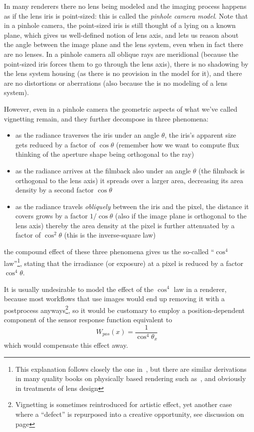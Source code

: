 In many renderers there no lens being modeled and the imaging process happens as if the
lens \gls{iris} is point-sized: this is called the \textsl{\gls{pinhole camera} model}.
Note that in a pinhole camera, the point-sized iris is still thought of a lying on a known plane,
which gives us well-defined notion of lens axis, and lets us reason about the angle between the
image plane and the lens system, even when in fact there are no lenses.
In a pinhole camera all oblique rays are meridional (because the point-sized iris forces
them to go through the lens axis), there is no shadowing by the lens system housing (as there
is no provision in the model for it), and there are no distortions or aberrations (also because
the is no modeling of a lens system).


However, even in a pinhole camera the geometric aspects of what we've called vignetting remain, 
and they further decompose in three phenomena:
\begin{itemize}
	\item as the radiance traverses the iris under an angle $\theta$,
	      the iris's apparent size gets reduced by a factor of $\cos\theta$ (remember how we
	      want to compute flux thinking of the aperture shape being orthogonal
	      to the ray)
	\item as the radiance arrives at the filmback also under an angle $\theta$
		  (the filmback is orthogonal to the lens axis) it spreads over
		  a larger area, decreasing its area density by a second factor $\cos\theta$
	\item as the radiance travels \emph{obliquely} between the iris and the pixel,
		  the distance it covers grows by a factor $1/\cos\theta$ (also if the image plane is
		  orthogonal to the lens axis) thereby the area density
		  at the pixel is further attenuated by a factor of $\cos^2\theta$ (this is
		  the inverse-square law)
\end{itemize}
the compound effect of these three phenomena gives us the so-called ``$\cos^4$ law''\footnote{
	This explanation follows closely the one in~\cite[Ch. 6]{kingslake92}, but there are 
	similar derivations in many quality books on physically based rendering such 
	as~\cite[Ch. 5.4]{pharr2023}, and obviously in treatments of lens design}, 
stating that the irradiance (or exposure) at a pixel is reduced by a factor $\cos^4\theta$.

It is usually undesirable to model the effect of the $\cos^4$ law in a \gls{renderer},
because most workflows that use images would end up removing it with a postprocess anyways\footnote{
Vignetting is sometimes reintroduced for artistic effect, yet another case where a ``defect'' is 
repurposed into a creative opportunity, see discussion on page \pageref{defects_as_opportunity}},
so it would be customary to employ a position-dependent component of the sensor 
response function equivalent to
\begin{equation}
	W_{pos}(x) = \frac{1}{\cos^4\theta_{x}}
\end{equation}
which would compensate this effect away.

